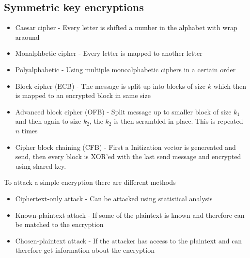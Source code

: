 \documentclass[12pt, a4paper]{article}
\begin{document}
		\subsection{Symmetric key encryptions}
			\begin{itemize}
				\item Caesar cipher - Every letter is shifted a number in the alphabet with wrap araound
				\item Monalphbetic cipher - Every letter is mapped to another letter
				\item Polyalphabetic - Using multiple monoalphabetic ciphers in a certain order
				\item Block cipher (ECB) -  The message is split up into blocks of size $k$ which then is mapped to an encrypted block in same size
				\item Advanced block cipher (OFB) - Split message up to smaller block of size $k_1$ and then again to size $k_2$, the $k_2$ is then scrambled in place. This is repeated $n$ times
				\item Cipher block chaining (CFB) - First a Initization vector is genereated and send, then every block is XOR'ed with the last send message and encrypted using shared key.
			\end{itemize}
			To attack a simple encryption there are different methods
			\begin{itemize}
				\item Ciphertext-only attack - Can be attacked using statistical analysis
				\item Known-plaintext attack - If some of the plaintext is known and therefore can be matched to the encryption
				\item Chosen-plaintext attack - If the attacker has access to the plaintext and can therefore get information about the encryption
			\end{itemize}
\end{document}
